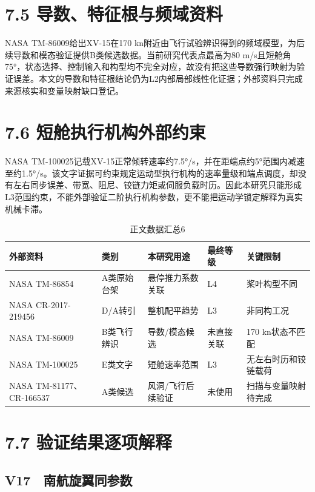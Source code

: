 \documentclass[UTF8,12pt,openany]{ctexbook}
\begin{document}
\section{7.5 导数、特征根与频域资料}

NASA TM-86009给出XV-15在170 kn附近由飞行试验辨识得到的频域模型，为后续导数和模态验证提供B类候选数据。当前研究代表点最高为80 m/s且短舱角75°，状态选择、控制输入和构型均不完全对应，故没有把这些导数强行映射为验证误差。本文的导数和特征根结论仍为L2内部局部线性化证据；外部资料只完成来源核实和变量映射缺口登记。

\section{7.6 短舱执行机构外部约束}

NASA TM-100025记载XV-15正常倾转速率约7.5°/s，并在距端点约5°范围内减速至约1.5°/s。该文字证据可约束规定运动型执行机构的速率量级和端点调度，却没有左右同步误差、带宽、阻尼、铰链力矩或伺服负载时历。因此本研究只能形成L3范围约束，不能外部验证二阶执行机构参数，更不能把运动学锁定解释为真实机械卡滞。

\begin{longtable}{p{}p{}p{}p{}p{}}
\caption{正文数据汇总6}\label{tab:auto-6}\\
\toprule
外部资料 & 类别 & 本研究用途 & 最终等级 & 关键限制 \\
\midrule
NASA TM-86854 & A类原始台架 & 悬停推力系数关联 & L4 & 桨叶构型不同 \\
NASA CR-2017-219456 & D/A转引 & 整机配平趋势 & L3 & 非同构工况 \\
NASA TM-86009 & B类飞行辨识 & 导数/模态候选 & 未直接关联 & 170 kn状态不匹配 \\
NASA TM-100025 & E类文字 & 短舱速率范围 & L3 & 无左右时历和铰链载荷 \\
NASA TM-81177、CR-166537 & A类候选 & 风洞/飞行后续验证 & 未使用 & 扫描与变量映射待完成 \\
\bottomrule
\end{longtable}

\section{7.7 验证结果逐项解释}

\subsection{V17　南航旋翼同参数}
\end{document}
